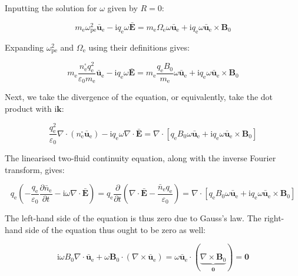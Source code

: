 Inputting the solution for $\omega$ given by $R=0$:

\begin{equation}
    \label{eq-4-60}
    m_\text{e}\omega_\text{pe}^2\bar{\mathbf{u}}_\text{e}-\mathrm{i}q_\text{e}\omega\bar{\mathbf{E}}=m_\text{e}\Omega_\text{e}\omega\bar{\mathbf{u}}_\text{e}+\mathrm{i}q_\text{e}\omega\bar{\mathbf{u}}_\text{e}\times\mathbf{B}_0
\end{equation}

Expanding $\omega_\text{pe}^2$ and $\Omega_\text{e}$ using their definitions gives:

\begin{equation}
    m_\text{e}\frac{n_\text{e}^\square q_\text{e}^2}{\varepsilon_0m_\text{e}}\bar{\mathbf{u}}_\text{e}-\mathrm{i}q_\text{e}\omega\bar{\mathbf{E}}=m_\text{e}\frac{q_\text{e}B_0}{m_\text{e}}\omega\bar{\mathbf{u}}_\text{e}+\mathrm{i}q_\text{e}\omega\bar{\mathbf{u}}_\text{e}\times\mathbf{B}_0
\end{equation}

Next, we take the divergence of the equation, or equivalently, take the dot product with $\mathrm{i}\mathbf{k}$:

\begin{equation}
    \frac{q_\text{e}^2}{\varepsilon_0}\nabla\cdot(n_\text{e}^\square\bar{\mathbf{u}}_\text{e})-\mathrm{i}q_\text{e}\omega\nabla\cdot\bar{\mathbf{E}}=\nabla\cdot\left[q_\text{e}B_0\omega\bar{\mathbf{u}}_\text{e}+\mathrm{i}q_\text{e}\omega\bar{\mathbf{u}}_\text{e}\times\mathbf{B}_0\right]
\end{equation}

The linearised two-fluid continuity equation, along with the inverse Fourier transform, gives:

\begin{equation}
    q_\text{e}\left(-\frac{q_\text{e}}{\varepsilon_0}\frac{\partial\bar{n}_\text{e}}{\partial t}-\mathrm{i}\omega\nabla\cdot\bar{\mathbf{E}}\right)=q_\text{e}\frac{\partial}{\partial t}\left(\nabla\cdot\bar{\mathbf{E}}-\frac{\bar{n}_\text{e}q_\text{e}}{\varepsilon_0}\right)=\nabla\cdot\left[q_\text{e}B_0\omega\bar{\mathbf{u}}_\text{e}+\mathrm{i}q_\text{e}\omega\bar{\mathbf{u}}_\text{e}\times\mathbf{B}_0\right]
\end{equation}

The left-hand side of the equation is thus zero due to Gauss's law. The right-hand side of the equation thus ought to be zero as well:

\begin{equation}
    \mathrm{i}\omega B_0\nabla\cdot\bar{\mathbf{u}}_\text{e}+\omega\mathbf{B}_0\cdot(\nabla\times\bar{\mathbf{u}}_\text{e})=\omega\bar{\mathbf{u}}_\text{e}\cdot(\underbrace{\nabla\times\mathbf{B}_0}_{\mathbf{0}})=\mathbf{0}
\end{equation}

